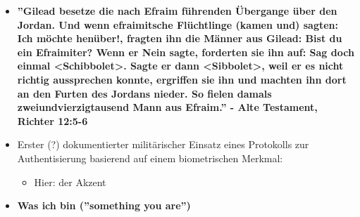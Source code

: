 \documentclass[openany]{book}
\begin{document}
\begin{itemize}
    \item \textbf{''Gilead besetze die nach Efraim führenden Übergange über den Jordan. Und wenn efraimitsche Flüchtlinge (kamen und) sagten: Ich möchte henüber!, fragten ihn die Männer aus Gilead: Bist du ein Efraimiter? Wenn er Nein sagte, forderten sie ihn auf: Sag doch einmal <Schibbolet>. Sagte er dann <Sibbolet>, weil er es nicht richtig aussprechen konnte, ergriffen sie ihn und machten ihn dort an den Furten des Jordans nieder. So fielen damals zweiundvierzigtausend Mann aus Efraim.'' - Alte Testament, Richter 12:5-6}
    \item Erster (?) dokumentierter militärischer Einsatz eines Protokolls zur Authentisierung basierend auf einem biometrischen Merkmal:
    \begin{itemize}
        \item Hier: der Akzent
    \end{itemize}
    \item \textbf{Was ich bin (''something you are'')}
\end{itemize}
\end{document}
